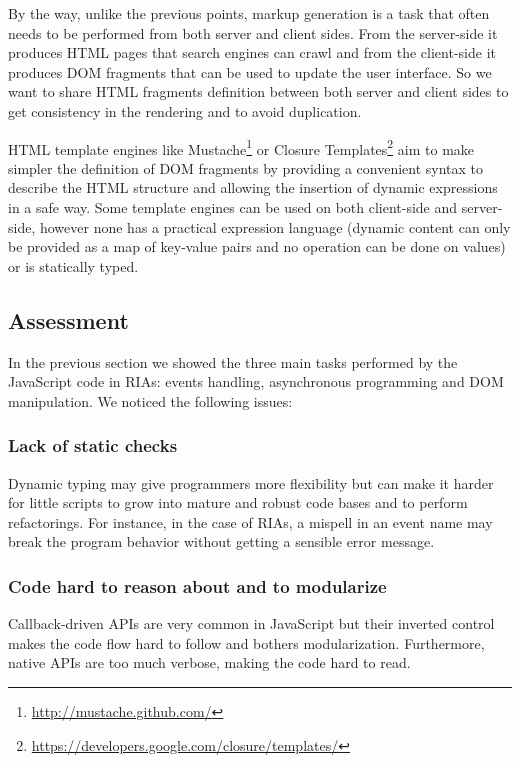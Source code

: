 \documentclass[american,english,runningheads]{llncs}
\begin{document}
By the way, unlike the previous points, markup generation is a task that often needs to be performed from both server and client sides. From the server-side it produces HTML pages that search engines can crawl and from the client-side it produces DOM fragments that can be used to update the user interface. So we want to share HTML fragments definition between both server and client sides to get consistency in the rendering and to avoid duplication.

HTML template engines like Mustache\footnote{\href{http://mustache.github.com/}{http://mustache.github.com/}} or Closure Templates\footnote{\href{https://developers.google.com/closure/templates/}{https://developers.google.com/closure/templates/}} aim to make simpler the definition of DOM fragments by providing a convenient syntax to describe the HTML structure and allowing the insertion of dynamic expressions in a safe way. Some template engines can be used on both client-side and server-side, however none has a practical expression language (dynamic content can only be provided as a map of key-value pairs and no operation can be done on values) or is statically typed.

\subsection{Assessment}

In the previous section we showed the three main tasks performed by the JavaScript code in RIAs: events handling, asynchronous programming and DOM manipulation. We noticed the following issues:

\subsubsection{Lack of static checks}

Dynamic typing may give programmers more flexibility but can make it harder for little scripts to grow into mature and robust code bases and to perform refactorings. For instance, in the case of RIAs, a mispell in an event name may break the program behavior without getting a sensible error message.

\subsubsection{Code hard to reason about and to modularize}

Callback-driven APIs are very common in JavaScript but their inverted control makes the code flow hard to follow and bothers modularization. Furthermore, native APIs are too much verbose, making the code hard to read.
\end{document}
